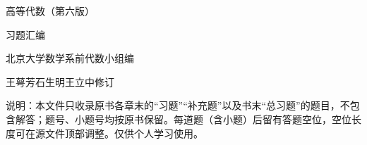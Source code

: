 \documentclass[UTF8,zihao=-4,a4paper,oneside]{ctexbook}
\begin{document}
\begin{titlepage}
\centering
\vspace*{5cm}
{\heiti\Huge 高等代数（第六版）\par}
\vspace{14pt}
{\heiti\LARGE 习题汇编\par}
\vspace{2.2cm}
{\large 北京大学数学系前代数小组\quad 编\par}
\vspace{8pt}
{\large 王萼芳\quad 石生明\quad 王立中\quad 修订\par}
\vfill
{\small\kaishu 说明：本文件只收录原书各章末的“习题”“补充题”以及书末“总习题”的题目，不包含解答；题号、小题号均按原书保留。每道题（含小题）后留有答题空位，空位长度可在源文件顶部调整。仅供个人学习使用。\par}
\vspace{1cm}
\end{titlepage}

{\linespread{0.92}\selectfont
\tableofcontents}
\clearpage












\end{document}
